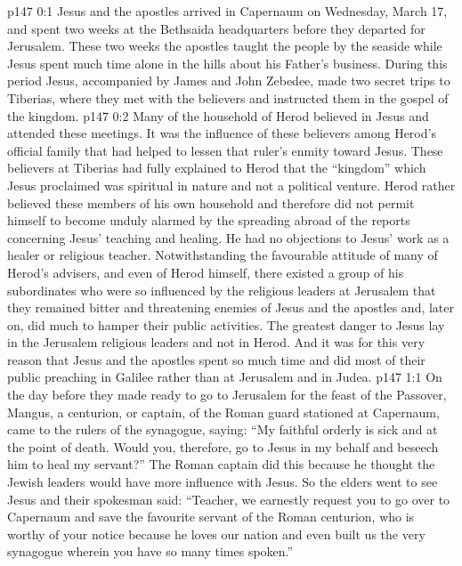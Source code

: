 \author{Midwayer Commission}
\vs p147 0:1 Jesus and the apostles arrived in Capernaum on Wednesday, March 17, and spent two weeks at the Bethsaida headquarters before they departed for Jerusalem. These two weeks the apostles taught the people by the seaside while Jesus spent much time alone in the hills about his Father’s business. During this period Jesus, accompanied by James and John Zebedee, made two secret trips to Tiberias, where they met with the believers and instructed them in the gospel of the kingdom.
\vs p147 0:2 Many of the household of Herod believed in Jesus and attended these meetings. It was the influence of these believers among Herod’s official family that had helped to lessen that ruler’s enmity toward Jesus. These believers at Tiberias had fully explained to Herod that the “kingdom” which Jesus proclaimed was spiritual in nature and not a political venture. Herod rather believed these members of his own household and therefore did not permit himself to become unduly alarmed by the spreading abroad of the reports concerning Jesus’ teaching and healing. He had no objections to Jesus’ work as a healer or religious teacher. Notwithstanding the favourable attitude of many of Herod’s advisers, and even of Herod himself, there existed a group of his subordinates who were so influenced by the religious leaders at Jerusalem that they remained bitter and threatening enemies of Jesus and the apostles and, later on, did much to hamper their public activities. The greatest danger to Jesus lay in the Jerusalem religious leaders and not in Herod. And it was for this very reason that Jesus and the apostles spent so much time and did most of their public preaching in Galilee rather than at Jerusalem and in Judea.
\vs p147 1:1 On the day before they made ready to go to Jerusalem for the feast of the Passover, Mangus, a centurion, or captain, of the Roman guard stationed at Capernaum, came to the rulers of the synagogue, saying: “My faithful orderly is sick and at the point of death. Would you, therefore, go to Jesus in my behalf and beseech him to heal my servant?” The Roman captain did this because he thought the Jewish leaders would have more influence with Jesus. So the elders went to see Jesus and their spokesman said: “Teacher, we earnestly request you to go over to Capernaum and save the favourite servant of the Roman centurion, who is worthy of your notice because he loves our nation and even built us the very synagogue wherein you have so many times spoken.”
